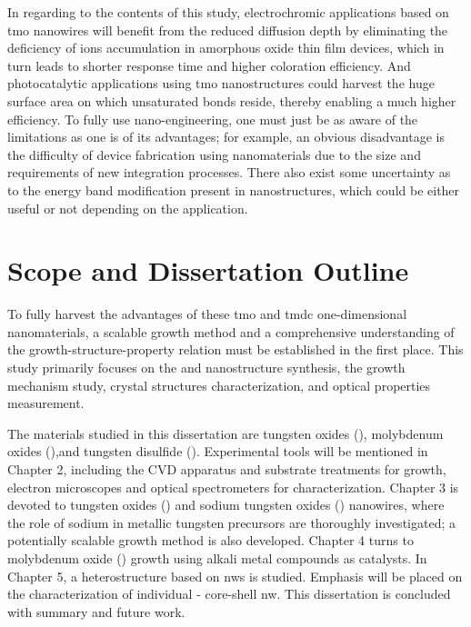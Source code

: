 In regarding to the contents of this study, electrochromic applications based on \gls{tmo} nanowires will benefit from the reduced diffusion depth by eliminating the deficiency of ions accumulation in amorphous oxide thin film devices, which in turn leads to shorter response time and higher coloration efficiency.\cite{Huang2008a,Scherer2012} And photocatalytic applications using \gls{tmo} nanostructures could harvest the huge surface area on which unsaturated bonds reside, thereby enabling a much higher efficiency.\cite{Mills1993,Merki2011,Chen2011b} To fully use nano-engineering, one must just be as aware of the limitations as one is of its advantages; for example, an obvious disadvantage is the difficulty of device fabrication using nanomaterials due to the size and requirements of new integration processes. There also exist some uncertainty as to the energy band modification present in nanostructures, which could be either useful or not depending on the application.\cite{Wang2012}

\section{Scope and Dissertation Outline}
To fully harvest the advantages of these \gls{tmo} and \gls{tmdc} one-dimensional nanomaterials, a scalable growth method and a comprehensive understanding of the growth-structure-property relation must be established in the first place. This study primarily focuses on the  and  nanostructure synthesis, the growth mechanism study, crystal structures characterization, and optical properties measurement.

The materials studied in this dissertation are tungsten oxides (), molybdenum oxides (),and tungsten disulfide (). Experimental tools will be mentioned in Chapter 2, including the CVD apparatus and substrate treatments for growth, electron microscopes and optical spectrometers for characterization. Chapter 3 is devoted to tungsten oxides () and sodium tungsten oxides () nanowires, where the role of sodium in metallic tungsten precursors are thoroughly investigated; a potentially scalable growth method is also developed. Chapter 4 turns to molybdenum oxide () growth using alkali metal compounds as catalysts. In Chapter 5, a heterostructure based on  \glspl{nw} is studied. Emphasis will be placed on the characterization of individual - core-shell \gls{nw}. This dissertation is concluded with summary and future work. 
